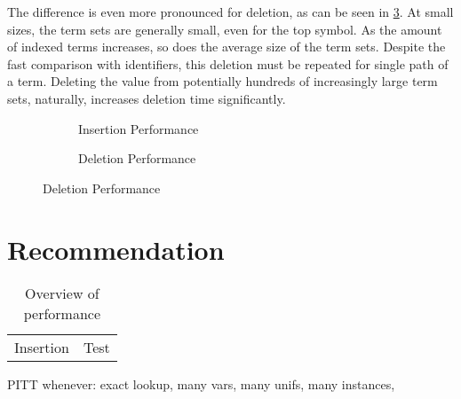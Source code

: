 The difference is even more pronounced for deletion, as can be seen in \cref{delete}. At small sizes, the term sets are generally small, even for the top symbol. As the amount of indexed terms increases, so does the average size of the term sets. Despite the fast comparison with identifiers, this deletion must be repeated for single path of a term. Deleting the value from potentially hundreds of increasingly large term sets, naturally, increases deletion time significantly.

\begin{figure}[h]
  \begin{subfigure}{0.45\textwidth}
\begin{adjustbox}{width=1\textwidth}
\end{adjustbox}
\caption{Insertion Performance}
\label{insert}
\end{subfigure}
\begin{subfigure}{0.1\textwidth}
\end{subfigure}
\begin{subfigure}{0.45\textwidth}
\begin{adjustbox}{width=1\textwidth}
\end{adjustbox}
\caption{Deletion Performance}
\label{delete}
\end{subfigure}
\end{figure}

\section{Recommendation}
\begin{table}
  \centering
\begin{tabular} { c c }
  Insertion & Test \\
\end{tabular}
\caption{Overview of performance}
\end{table}
PITT whenever: exact lookup, many vars, many unifs, many instances,

